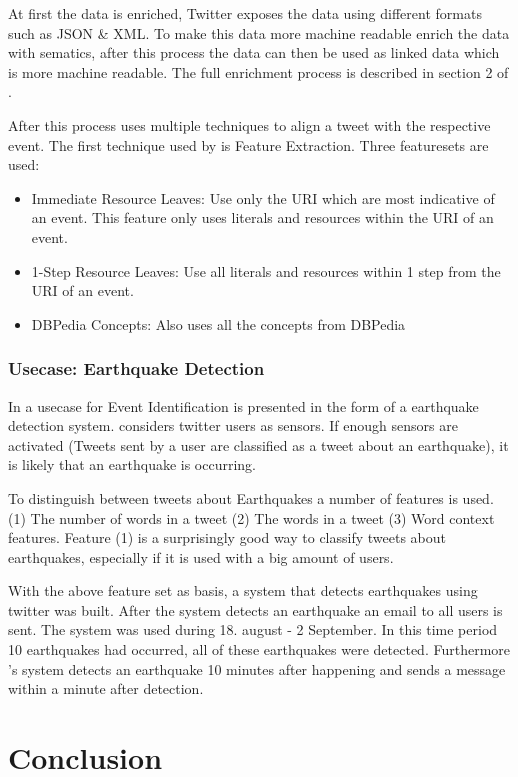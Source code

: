 \documentclass{article}
\begin{document}
At first the data is enriched, Twitter exposes the data using different formats such as JSON \& XML. To make this data more machine readable \cite{eventalign} enrich the data with sematics, after this process the data can then  be used as linked data which is more machine readable. The full enrichment process is described in section 2 of \cite{eventalign}.

After this process \cite{eventalign} uses multiple techniques to align a tweet with the respective event. The first technique used by \cite{eventalign} is Feature Extraction. Three featuresets are used:
\begin{itemize}
  \item Immediate Resource Leaves: Use only the URI which are most indicative of an event. This feature only uses literals and resources within the URI of an event. 
  \item 1-Step Resource Leaves: Use all literals and resources within 1 step from the URI of an event. 
  \item DBPedia Concepts: Also uses all the concepts from DBPedia 
\end{itemize}

\subsubsection{Usecase: Earthquake Detection}
In \cite{earthq} a usecase for Event Identification is presented in the form of a earthquake detection system. \cite{earthq} considers twitter users as sensors. If enough sensors are activated (Tweets sent by a user are classified as a tweet about an earthquake), it is likely that an earthquake is occurring. 

To distinguish between tweets about Earthquakes a number of features is used. (1) The number of words in a tweet (2) The words in a tweet (3) Word context features. Feature (1) is a surprisingly good way to classify tweets about earthquakes, especially if it is used with a big amount of users. 

With the above feature set as basis, a system that detects earthquakes using twitter was built. After the system detects an earthquake an email to all users is sent. The system was used during 18. august - 2 September. In this time period 10 earthquakes had occurred, all of these earthquakes were detected. Furthermore \cite{earthq}'s system detects an earthquake 10 minutes after happening and sends a message within a minute after detection. 

\newpage

\section{Conclusion}

\newpage



\end{document}
